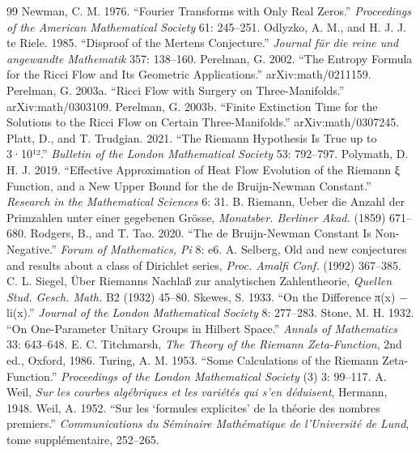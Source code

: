 \documentclass[10pt,twocolumn]{article}
\begin{document}
\begin{thebibliography}{99}
 Newman, C. M. 1976. ``Fourier Transforms with Only Real Zeros.'' \emph{Proceedings of the American Mathematical Society} 61: 245--251.
 Odlyzko, A. M., and H. J. J. te Riele. 1985. ``Disproof of the Mertens Conjecture.'' \emph{Journal für die reine und angewandte Mathematik} 357: 138--160.
 Perelman, G. 2002. ``The Entropy Formula for the Ricci Flow and Its Geometric Applications.'' arXiv:math/0211159.
 Perelman, G. 2003a. ``Ricci Flow with Surgery on Three-Manifolds.'' arXiv:math/0303109.
 Perelman, G. 2003b. ``Finite Extinction Time for the Solutions to the Ricci Flow on Certain Three-Manifolds.'' arXiv:math/0307245.
 Platt, D., and T. Trudgian. 2021. ``The Riemann Hypothesis Is True up to 3·10¹².'' \emph{Bulletin of the London Mathematical Society} 53: 792--797.
 Polymath, D. H. J. 2019. ``Effective Approximation of Heat Flow Evolution of the Riemann ξ Function, and a New Upper Bound for the de Bruijn-Newman Constant.'' \emph{Research in the Mathematical Sciences} 6: 31.
 B. Riemann, Ueber die Anzahl der Primzahlen unter einer gegebenen Gr\"osse, \emph{Monatsber. Berliner Akad.} (1859) 671--680.
 Rodgers, B., and T. Tao. 2020. ``The de Bruijn-Newman Constant Is Non-Negative.'' \emph{Forum of Mathematics, Pi} 8: e6.
 A. Selberg, Old and new conjectures and results about a class of Dirichlet series, \emph{Proc. Amalfi Conf.} (1992) 367--385.
 C. L. Siegel, \"Uber Riemanns Nachla\ss{} zur analytischen Zahlentheorie, \emph{Quellen Stud. Gesch. Math.} B2 (1932) 45--80.
 Skewes, S. 1933. ``On the Difference π(x) − li(x).'' \emph{Journal of the London Mathematical Society} 8: 277--283.
 Stone, M. H. 1932. ``On One-Parameter Unitary Groups in Hilbert Space.'' \emph{Annals of Mathematics} 33: 643--648.
 E. C. Titchmarsh, \emph{The Theory of the Riemann Zeta-Function}, 2nd ed., Oxford, 1986.
 Turing, A. M. 1953. ``Some Calculations of the Riemann Zeta-Function.'' \emph{Proceedings of the London Mathematical Society} (3) 3: 99--117.
 A. Weil, \emph{Sur les courbes alg\'ebriques et les vari\'et\'es qui s'en d\'eduisent}, Hermann, 1948.
 Weil, A. 1952. ``Sur les `formules explicites' de la théorie des nombres premiers.'' \emph{Communications du Séminaire Mathématique de l'Université de Lund}, tome supplémentaire, 252--265.
\end{thebibliography}
\end{document}
